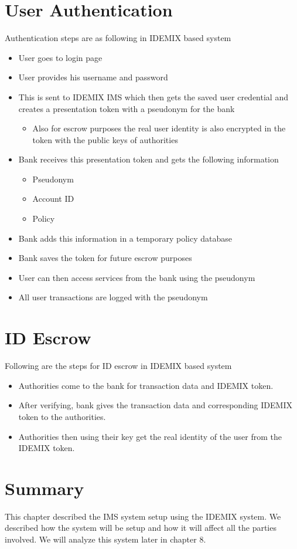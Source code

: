 \section{User Authentication}
Authentication steps are as following in IDEMIX based system
\begin{itemize}
	\item User goes to login page
	\item User provides his username and password
	\item This is sent to IDEMIX IMS which then gets the saved user credential and creates a presentation token with a pseudonym for the bank
	\begin{itemize}
		\item Also for escrow purposes the real user identity is also encrypted in the token with the public keys of authorities
	\end{itemize}
	\item Bank receives this presentation token and gets the following information
	\begin{itemize}
		\item Pseudonym
		\item Account ID
		\item Policy
	\end{itemize}
	\item Bank adds this information in a temporary policy database
	\item Bank saves the token for future escrow purposes
	\item User can then access services from the bank using the pseudonym
	\item All user transactions are logged with the pseudonym
\end{itemize}
\section{ID Escrow}
Following are the steps for ID escrow in IDEMIX based system
\begin{itemize}
	\item Authorities come to the bank for transaction data and IDEMIX token.
	\item After verifying, bank gives the transaction data and corresponding IDEMIX token to the authorities.
	\item Authorities then using their key get the real identity of the user from the IDEMIX token.
\end{itemize}
\section{Summary}
This chapter described the IMS system setup using the IDEMIX system. We described how the system will be setup and how it will affect all the parties involved. We will analyze this system later in chapter 8.

